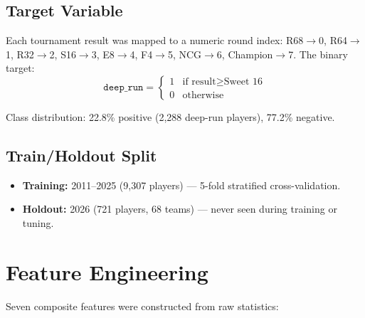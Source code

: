 \documentclass[12pt, a4paper]{article}
\begin{document}
\subsection{Target Variable}

Each tournament result was mapped to a numeric round index: R68$\to$0, R64$\to$1, R32$\to$2, S16$\to$3, E8$\to$4, F4$\to$5, NCG$\to$6, Champion$\to$7. The binary target:
\begin{equation}
    \texttt{deep\_run} =
    \begin{cases}
        1 & \text{if result} \geq \text{Sweet 16} \\
        0 & \text{otherwise}
    \end{cases}
\end{equation}

Class distribution: 22.8\% positive (2,288 deep-run players), 77.2\% negative.

\subsection{Train/Holdout Split}

\begin{itemize}
    \item \textbf{Training:} 2011--2025 (9,307 players) --- 5-fold stratified cross-validation.
    \item \textbf{Holdout:} 2026 (721 players, 68 teams) --- never seen during training or tuning.
\end{itemize}

\section{Feature Engineering}
\label{sec:features}

Seven composite features were constructed from raw statistics:
\end{document}
